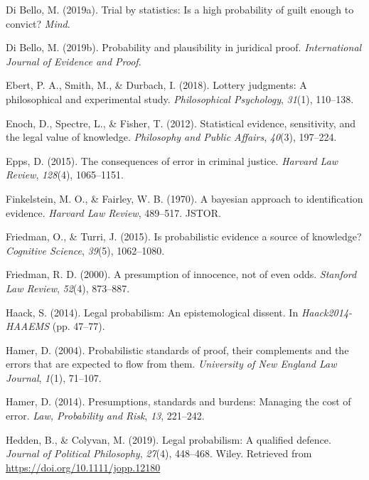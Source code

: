 \documentclass[10pt,dvipsnames,enabledeprecatedfontcommands]{scrartcl}
\begin{document}
\leavevmode\hypertarget{ref-diBello2019}{}%
Di Bello, M. (2019a). Trial by statistics: Is a high probability of
guilt enough to convict? \emph{Mind}.

\leavevmode\hypertarget{ref-DiBello2019plausibility}{}%
Di Bello, M. (2019b). Probability and plausibility in juridical proof.
\emph{International Journal of Evidence and Proof}.

\leavevmode\hypertarget{ref-ebert2018}{}%
Ebert, P. A., Smith, M., \& Durbach, I. (2018). Lottery judgments: A
philosophical and experimental study. \emph{Philosophical Psychology},
\emph{31}(1), 110--138.

\leavevmode\hypertarget{ref-Enoch2012Statistical}{}%
Enoch, D., Spectre, L., \& Fisher, T. (2012). Statistical evidence,
sensitivity, and the legal value of knowledge. \emph{Philosophy and
Public Affairs}, \emph{40}(3), 197--224.

\leavevmode\hypertarget{ref-epps2015}{}%
Epps, D. (2015). The consequences of error in criminal justice.
\emph{Harvard Law Review}, \emph{128}(4), 1065--1151.

\leavevmode\hypertarget{ref-finkelstein1970bayesian}{}%
Finkelstein, M. O., \& Fairley, W. B. (1970). A bayesian approach to
identification evidence. \emph{Harvard Law Review}, 489--517. JSTOR.

\leavevmode\hypertarget{ref-friedman2015}{}%
Friedman, O., \& Turri, J. (2015). Is probabilistic evidence a source of
knowledge? \emph{Cognitive Science}, \emph{39}(5), 1062--1080.

\leavevmode\hypertarget{ref-Friedman2000presumption}{}%
Friedman, R. D. (2000). A presumption of innocence, not of even odds.
\emph{Stanford Law Review}, \emph{52}(4), 873--887.

\leavevmode\hypertarget{ref-haack2011legal}{}%
Haack, S. (2014). Legal probabilism: An epistemological dissent. In
\emph{Haack2014-HAAEMS} (pp. 47--77).

\leavevmode\hypertarget{ref-hamer2004}{}%
Hamer, D. (2004). Probabilistic standards of proof, their complements
and the errors that are expected to flow from them. \emph{University of
New England Law Journal}, \emph{1}(1), 71--107.

\leavevmode\hypertarget{ref-hamer2014}{}%
Hamer, D. (2014). Presumptions, standards and burdens: Managing the cost
of error. \emph{Law, Probability and Risk}, \emph{13}, 221--242.

\leavevmode\hypertarget{ref-HeddenColyvan2019legal}{}%
Hedden, B., \& Colyvan, M. (2019). Legal probabilism: A qualified
defence. \emph{Journal of Political Philosophy}, \emph{27}(4), 448--468.
Wiley. Retrieved from \url{https://doi.org/10.1111/jopp.12180}
\end{document}
